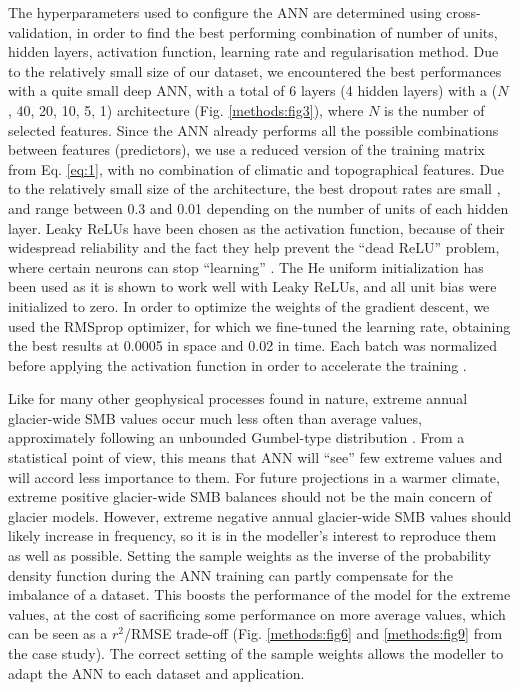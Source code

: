 The hyperparameters used to configure the ANN are determined using cross-validation, in order to find the best performing combination of number of units, hidden layers, activation function, learning rate and regularisation method. Due to the relatively small size of our dataset, we encountered the best performances with a quite small deep ANN, with a total of 6 layers (4 hidden layers) with a ($N$, 40, 20, 10, 5, 1) architecture (Fig. \ref{methods:fig3}), where $N$ is the number of selected features. Since the ANN already performs all the possible combinations between features (predictors), we use a reduced version of the training matrix from Eq. \ref{eq:1}, with no combination of climatic and topographical features. Due to the relatively small size of the architecture, the best dropout rates are small \citep{srivastava_dropout:_2014}, and range between 0.3 and 0.01 depending on the number of units of each hidden layer. Leaky ReLUs have been chosen as the activation function, because of their widespread reliability and the fact they help prevent the “dead ReLU” problem, where certain neurons can stop “learning” \citep{xu_empirical_2015}. The He uniform initialization \citep{he_delving_2015} has been used as it is shown to work well with Leaky ReLUs, and all unit bias were initialized to zero. In order to optimize the weights of the gradient descent, we used the RMSprop optimizer, for which we fine-tuned the learning rate, obtaining the best results at 0.0005 in space and 0.02 in time. Each batch was normalized before applying the activation function in order to accelerate the training \citep{ioffe_batch_2015}. 

Like for many other geophysical processes found in nature, extreme annual glacier-wide SMB values occur much less often than average values, approximately following an unbounded Gumbel-type distribution \citep{thibert_causes_2018}. From a statistical point of view, this means that ANN will “see” few extreme values and will accord less importance to them. For future projections in a warmer climate, extreme positive glacier-wide SMB balances should not be the main concern of glacier models. However, extreme negative annual glacier-wide SMB values should likely increase in frequency, so it is in the modeller’s interest to reproduce them as well as possible. Setting the sample weights as the inverse of the probability density function during the ANN training can partly compensate for the imbalance of a dataset. This boosts the performance of the model for the extreme values, at the cost of sacrificing some performance on more average values, which can be seen as a \(r^2\)/RMSE trade-off (Fig. \ref{methods:fig6} and \ref{methods:fig9} from the case study). The correct setting of the sample weights allows the modeller to adapt the ANN to each dataset and application. 

